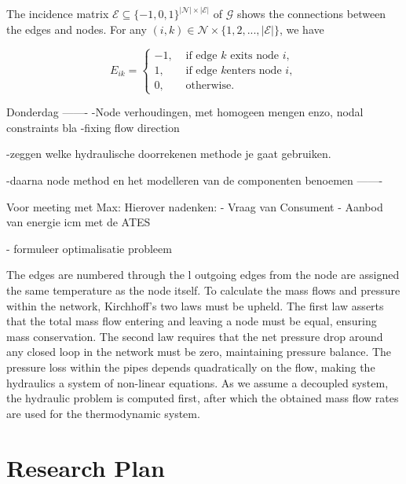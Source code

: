 The incidence matrix $\mathcal{E} \subseteq \{-1,0,1\}^{|\mathcal{N}| \times |\mathcal{E}|}$ of $\mathcal{G}$ shows the connections between the edges and nodes. 
For any $(i,k) \in \mathcal{N} \times \{1,2,...,|\mathcal{E}|\}$, we have

\begin{equation}
E_{i k}= \begin{cases}-1, & \text { if edge } k \text { exits node } i, \\ 1, & \text { if edge } k \text {enters node } i, \\ 0, & \text { otherwise. }\end{cases}
\end{equation}

Donderdag
-------
-Node verhoudingen, met homogeen mengen enzo, nodal constraints bla
-fixing flow direction

-zeggen welke hydraulische doorrekenen methode je gaat gebruiken.

-daarna node method
en het modelleren van de componenten benoemen
-------

Voor meeting met Max: 
Hierover nadenken:
- Vraag van Consument
- Aanbod van energie icm met de ATES


- formuleer optimalisatie probleem

\cite{sibeijn2025economic}


The edges are numbered through the 
l outgoing edges from the node are assigned the same temperature as the node itself. To calculate the mass flows and pressure within the network, Kirchhoff's two laws must be upheld. The first law asserts that the total mass flow entering and leaving a node must be equal, ensuring mass conservation. The second law requires that the net pressure drop around any closed loop in the network must be zero, maintaining pressure balance. The pressure loss within the pipes depends quadratically on the flow, making the hydraulics a system of non-linear equations. As we assume a decoupled system, the hydraulic problem is computed first, after which the obtained mass flow rates are used for the thermodynamic system.


\section{Research Plan}
